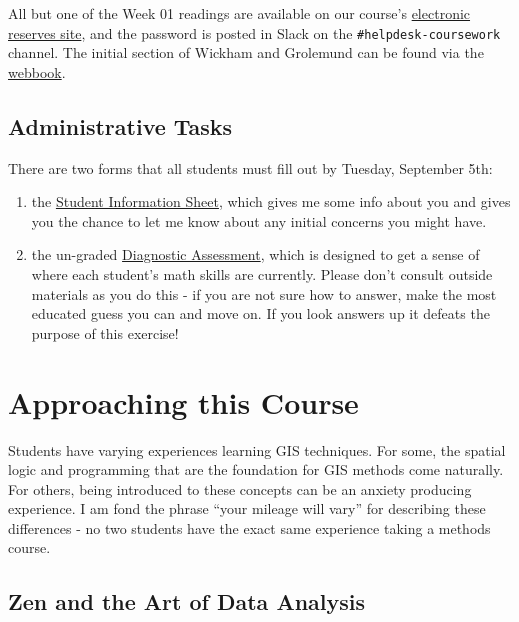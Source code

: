 \documentclass[]{book}
\theoremstyle{definition}
\theoremstyle{definition}
\theoremstyle{remark}
\begin{document}
All but one of the Week 01 readings are available on our course's
\href{http://eres.slu.edu/eres/coursepass.aspx?cid=4487}{electronic
reserves site}, and the password is posted in Slack on the
\texttt{\#helpdesk-coursework} channel. The initial section of Wickham
and Grolemund can be found via the
\href{http://r4ds.had.co.nz}{webbook}.

\section{Administrative Tasks}\label{administrative-tasks}

There are two forms that all students must fill out by Tuesday,
September 5th:

\begin{enumerate}
\def\labelenumi{\arabic{enumi}.}
\item
  the \href{https://goo.gl/forms/HddqLWd00qz6Qs903}{Student Information
  Sheet}, which gives me some info about you and gives you the chance to
  let me know about any initial concerns you might have.
\item
  the un-graded \href{https://goo.gl/forms/EgVGaUWu8mys2yBr2}{Diagnostic
  Assessment}, which is designed to get a sense of where each student's
  math skills are currently. Please don't consult outside materials as
  you do this - if you are not sure how to answer, make the most
  educated guess you can and move on. If you look answers up it defeats
  the purpose of this exercise!
\end{enumerate}

\chapter{Approaching this Course}\label{approaching-this-course}

Students have varying experiences learning GIS techniques. For some, the
spatial logic and programming that are the foundation for GIS methods
come naturally. For others, being introduced to these concepts can be an
anxiety producing experience. I am fond the phrase ``your mileage will
vary'' for describing these differences - no two students have the exact
same experience taking a methods course.

\section{Zen and the Art of Data
Analysis}\label{zen-and-the-art-of-data-analysis}
\end{document}
